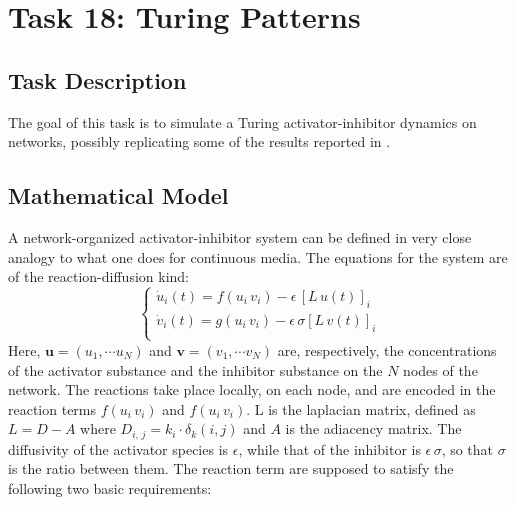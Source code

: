\chapter{Task 18: Turing Patterns}

\section{Task Description}
The goal of this task is to simulate a Turing activator-inhibitor dynamics on networks, possibly replicating some of the results reported in \cite{main_network}. 
\section{Mathematical Model}
A network-organized activator-inhibitor system can be defined in very close analogy to what one does for continuous media. 
The equations for the system are of the reaction-diffusion kind:
$$
\begin{cases}
\dot{u}_i(t) = f(u_i\, v_i) - \epsilon\,[L\,u(t)]_i \\
\dot{v}_i(t) = g(u_i\, v_i) - \epsilon\, \sigma [L\,v(t)]_i \\
\end{cases}
$$
Here, $\mathbf{u} = (u_1, \cdots u_N)$ and $\mathbf{v} = (v_1, \cdots v_N)$ are, respectively, the concentrations of the activator substance and the inhibitor substance on the $N$ nodes of the network. The reactions take place locally, on each node, and are encoded in the reaction terms $f(u_i\, v_i)$ and $f(u_i\, v_i)$. L is the laplacian matrix, defined as $L=D-A$ where $D_{i,\,j}=k_i \cdot \delta_k(i,j)$ and $A$ is the adiacency matrix. The diffusivity of the activator species is $\epsilon$, while that of the inhibitor is $\epsilon\,\sigma$, so that $\sigma$ is the ratio between them. The reaction term are supposed to satisfy the following two basic requirements:
